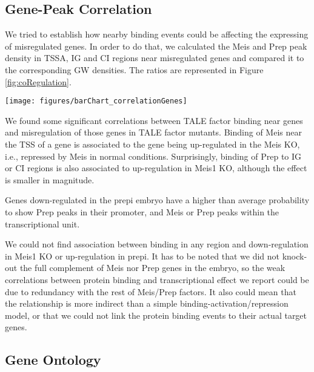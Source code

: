 \subsection{Gene-Peak Correlation}

We tried to establish how nearby binding events could be affecting the expressing of misregulated genes. In order to do that, we calculated the Meis and Prep peak density in \ac{TSSA}, \ac{IG} and \ac{CI} regions near misregulated genes and compared it to the corresponding \ac{GW} densities. The ratios are represented in Figure \ref{fig:coRegulation}.

\begin{SCfigure}[]
  \centering
  \texttt{[image: figures/barChart\_correlationGenes]}
  \caption[Correlation Between Misregulation and TALE Binding]{\textbf{Correlation Between Misregulation and TALE Binding.} Ratio of Meis and Prep peak density in misregulated gene-associated \ac{TSSA}, \ac{IG} and \ac{CI} regions to the corresponding \ac{GW} averages. Asterisks mark p-value $ < 10^{-3}$.}
  \label{fig:coRegulation}
\end{SCfigure}

We found some significant correlations between \ac{TALE} factor binding near genes and misregulation of those genes in \ac{TALE} factor mutants. Binding of Meis near the \ac{TSS} of a gene is associated to the gene being up-regulated in the Meis \ac{KO}, i.e., repressed by Meis in normal conditions. Surprisingly, binding of Prep to \ac{IG} or \ac{CI} regions is also associated to up-regulation in Meis1 \ac{KO}, although the effect is smaller in magnitude. 

Genes down-regulated in the \ac{prepi} embryo have a higher than average probability to show Prep peaks in their promoter, and Meis or Prep peaks within the transcriptional unit. 

We could not find association between binding in any region and down-regulation in Meis1 \ac{KO} or up-regulation in \ac{prepi}. It has to be noted that we did not knock-out the full complement of Meis nor Prep genes in the embryo, so the weak correlations between protein binding and transcriptional effect we report could be due to redundancy with the rest of Meis/Prep factors. It also could mean that the relationship is more indirect than a simple binding-activation/repression model, or that we could not link the protein binding events to their actual target genes. 

\subsection{Gene Ontology}

